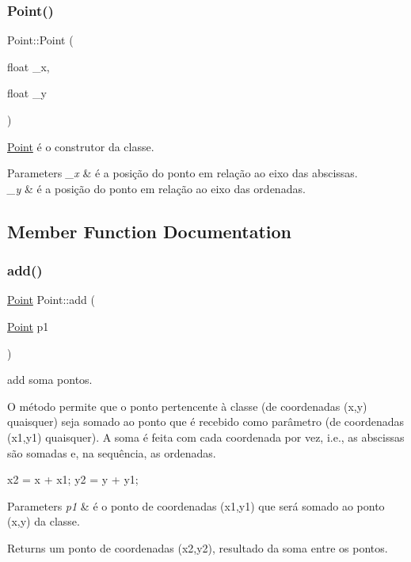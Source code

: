 \subsubsection{\texorpdfstring{Point()}{Point()}}
{\footnotesize\ttfamily Point\+::\+Point (\begin{DoxyParamCaption}\item[{float}]{\+\_\+x,  }\item[{float}]{\+\_\+y }\end{DoxyParamCaption})}



\mbox{\hyperlink{class_point}{Point}} é o construtor da classe. 


\begin{DoxyParams}{Parameters}
{\em \+\_\+x} & é a posição do ponto em relação ao eixo das abscissas.\\
\hline
{\em \+\_\+y} & é a posição do ponto em relação ao eixo das ordenadas. \\
\hline
\end{DoxyParams}


\subsection{Member Function Documentation}
\mbox{\label{class_point_a9dbea84b07b0a8ec3bbb9e58b3d15899}} 
\subsubsection{\texorpdfstring{add()}{add()}}
{\footnotesize\ttfamily \mbox{\hyperlink{class_point}{Point}} Point\+::add (\begin{DoxyParamCaption}\item[{\mbox{\hyperlink{class_point}{Point}}}]{p1 }\end{DoxyParamCaption})}



add soma pontos. 

O método permite que o ponto pertencente à classe (de coordenadas (x,y) quaisquer) seja somado ao ponto que é recebido como parâmetro (de coordenadas (x1,y1) quaisquer). A soma é feita com cada coordenada por vez, i.\+e., as abscissas são somadas e, na sequência, as ordenadas.

x2 = x + x1; y2 = y + y1;


\begin{DoxyParams}{Parameters}
{\em p1} & é o ponto de coordenadas (x1,y1) que será somado ao ponto (x,y) da classe.\\
\hline
\end{DoxyParams}
\begin{DoxyReturn}{Returns}
um ponto de coordenadas (x2,y2), resultado da soma entre os pontos. 
\end{DoxyReturn}
\mbox{\label{class_point_a9aa94b8fd07296e64d304ef3750db113}} 
